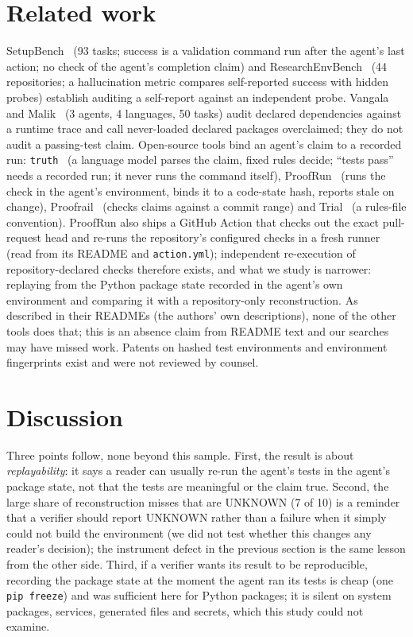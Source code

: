 \documentclass[10pt,conference]{IEEEtran}
\newcommand{\pip}{\texttt{pip freeze}}
\begin{document}
\section{Related work}\label{sec:rw}
SetupBench~\cite{setupbench} (93 tasks; success is a validation command run after the agent's last action; no check of the agent's completion claim) and ResearchEnvBench~\cite{renv} (44 repositories; a hallucination metric compares self-reported success with hidden probes) establish auditing a self-report against an independent probe. Vangala and Malik~\cite{vangala} (3 agents, 4 languages, 50 tasks) audit declared dependencies against a runtime trace and call never-loaded declared packages overclaimed; they do not audit a passing-test claim. Open-source tools bind an agent's claim to a recorded run: \texttt{truth}~\cite{truth} (a language model parses the claim, fixed rules decide; ``tests pass'' needs a recorded run; it never runs the command itself), ProofRun~\cite{proofrun} (runs the check in the agent's environment, binds it to a code-state hash, reports stale on change), Proofrail~\cite{proofrail} (checks claims against a commit range) and Trial~\cite{trial} (a rules-file convention). ProofRun also ships a GitHub Action that checks out the exact pull-request head and re-runs the repository's configured checks in a fresh runner (read from its README and \texttt{action.yml}); independent re-execution of repository-declared checks therefore exists, and what we study is narrower: replaying from the Python package state recorded in the agent's own environment and comparing it with a repository-only reconstruction. As described in their READMEs (the authors' own descriptions), none of the other tools does that; this is an absence claim from README text and our searches may have missed work. Patents on hashed test environments and environment fingerprints exist and were not reviewed by counsel.

\section{Discussion}
Three points follow, none beyond this sample. First, the result is about \emph{replayability}: it says a reader can usually re-run the agent's tests in the agent's package state, not that the tests are meaningful or the claim true. Second, the large share of reconstruction misses that are UNKNOWN (7 of 10) is a reminder that a verifier should report UNKNOWN rather than a failure when it simply could not build the environment (we did not test whether this changes any reader's decision); the instrument defect in the previous section is the same lesson from the other side. Third, if a verifier wants its result to be reproducible, recording the package state at the moment the agent ran its tests is cheap (one \pip{}) and was sufficient here for Python packages; it is silent on system packages, services, generated files and secrets, which this study could not examine.
\end{document}
